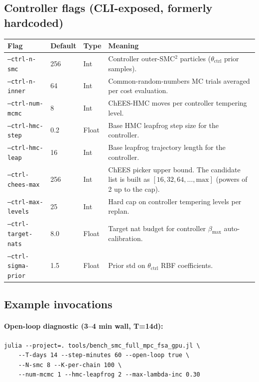 \documentclass[11pt,a4paper]{article}
\begin{document}
\subsection{Controller flags (CLI-exposed, formerly hardcoded)}

\noindent
\begin{longtable}{@{}lp{}lp{}@{}}
\toprule
Flag & Default & Type & Meaning \\
\midrule
\texttt{--ctrl-n-smc} & 256 & Int &
  Controller outer-SMC$^2$ particles ($\theta_{\text{ctrl}}$ prior
  samples). \\
\texttt{--ctrl-n-inner} & 64 & Int &
  Common-random-numbers MC trials averaged per cost evaluation. \\
\texttt{--ctrl-num-mcmc} & 8 & Int &
  ChEES-HMC moves per controller tempering level. \\
\texttt{--ctrl-hmc-step} & 0.2 & Float &
  Base HMC leapfrog step size for the controller. \\
\texttt{--ctrl-hmc-leap} & 16 & Int &
  Base leapfrog trajectory length for the controller. \\
\texttt{--ctrl-chees-max} & 256 & Int &
  ChEES picker upper bound. The candidate list is built as
  $[16, 32, 64, \dots, \text{max}]$ (powers of 2 up to the cap). \\
\texttt{--ctrl-max-levels} & 25 & Int &
  Hard cap on controller tempering levels per replan. \\
\texttt{--ctrl-target-nats} & 8.0 & Float &
  Target nat budget for controller $\beta_{\max}$ auto-calibration. \\
\texttt{--ctrl-sigma-prior} & 1.5 & Float &
  Prior std on $\theta_{\text{ctrl}}$ RBF coefficients. \\
\bottomrule
\end{longtable}

\subsection{Example invocations}

\paragraph{Open-loop diagnostic (3--4 min wall, T=14d):}

\begin{verbatim}
julia --project=. tools/bench_smc_full_mpc_fsa_gpu.jl \
    --T-days 14 --step-minutes 60 --open-loop true \
    --N-smc 8 --K-per-chain 100 \
    --num-mcmc 1 --hmc-leapfrog 2 --max-lambda-inc 0.30
\end{verbatim}
\end{document}
